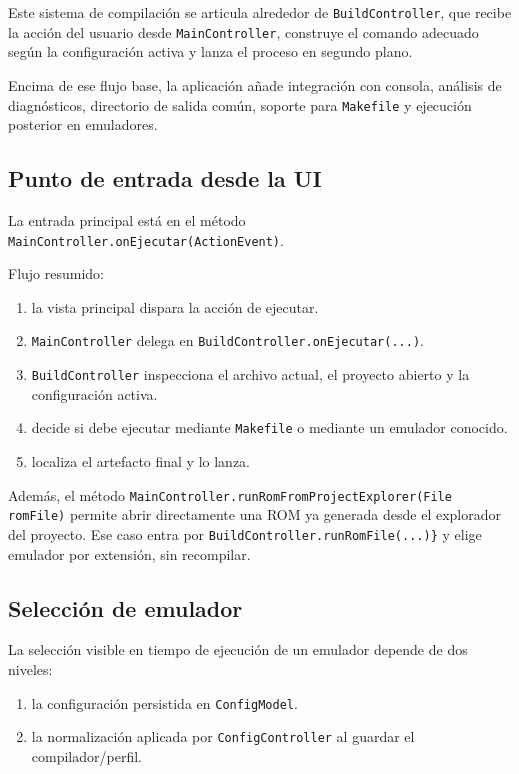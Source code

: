 \documentclass[../../main.tex]{subfiles}
\begin{document}
Este sistema de compilación se articula alrededor de \lstinline|BuildController|, que recibe la acción del usuario desde \lstinline|MainController|, construye el comando adecuado según la configuración activa y lanza el proceso en segundo plano.

Encima de ese flujo base, la aplicación añade integración con consola, análisis de diagnósticos, directorio de salida común, soporte para \lstinline|Makefile| y ejecución posterior en emuladores.

\clearpage

\subsection{Punto de entrada desde la UI}

La entrada principal está en el método \lstinline|MainController.onEjecutar(ActionEvent)|.

Flujo resumido:
\begin{enumerate}
    \item la vista principal dispara la acción de ejecutar.
    \item \lstinline|MainController| delega en \lstinline|BuildController.onEjecutar(...)|.
    \item \lstinline|BuildController| inspecciona el archivo actual, el proyecto abierto y la configuración activa.
    \item decide si debe ejecutar mediante \lstinline|Makefile| o mediante un emulador conocido.
    \item localiza el artefacto final y lo lanza.
\end{enumerate}

Además, el método \lstinline|MainController.runRomFromProjectExplorer(File romFile)| permite abrir directamente una ROM ya generada desde el explorador del proyecto. Ese caso entra por \lstinline|BuildController.runRomFile(...)}| y elige emulador por extensión, sin recompilar.

\subsection{Selección de emulador}

La selección visible en tiempo de ejecución de un emulador depende de dos niveles:

\begin{enumerate}
    \item la configuración persistida en \lstinline|ConfigModel|.
    \item la normalización aplicada por \lstinline|ConfigController| al guardar el compilador/perfil.
\end{enumerate}
\end{document}
